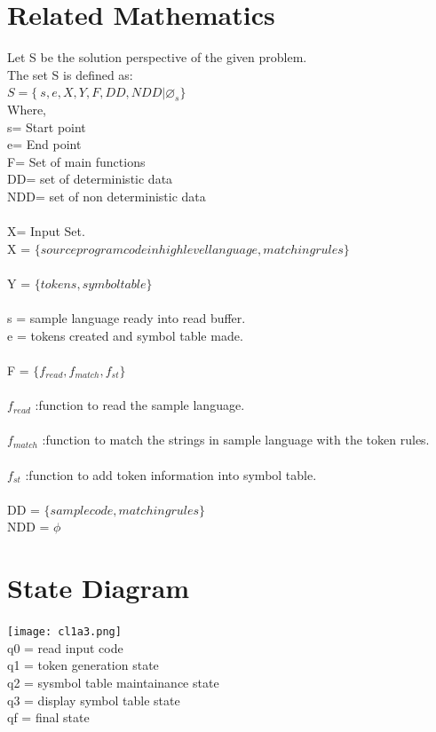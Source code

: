 \documentclass[10pt,a4paper]{article}
\begin{document}
\section{Related Mathematics}
Let S be the solution perspective of the given problem.
\\The set S is defined as:
\\$S=\lbrace\ s,e,X,Y,F,DD,NDD|\varnothing_{s}\rbrace$
\\Where,
\\s= Start point 
\\e= End point 
\\F= Set of main functions
\\DD= set of deterministic data
\\NDD= set of non deterministic data
\\\\X= Input Set.
\\X = $\lbrace source program code in high level language, matching rules \rbrace$
\\\\ Y = $\lbrace tokens, symbol table \rbrace$ 
\\\\ s = sample language ready into read buffer.
\\ e = tokens created and symbol table made.
\\\\ F = $\lbrace f_{read}, f_{match}, f_{st} \rbrace$
\\\\$f_{read}$  :function to read the sample language.
\\\\ $f_{match}$ :function to match the strings in sample language with the token rules.
\\\\ $f_{st}$ :function to add token information into symbol table.
\\\\ DD = $\lbrace sample code, matching rules \rbrace$
\\ NDD = $\phi$


\section{State Diagram}
\texttt{[image: cl1a3.png]}
\\q0 = read input code
\\q1 = token generation state
\\q2 = sysmbol table maintainance state
\\q3 = display symbol table state
\\qf = final state
\end{document}
